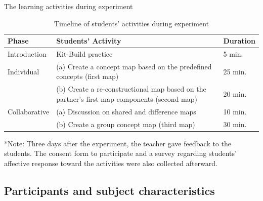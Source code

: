\begin{frame}{The learning activities during experiment}
\begin{table}[tb]
\begin{center}
\begin{tabular}{p{2.5cm}|p{5.5cm}|p{2cm}}%
\hline
Phase & Students' Activity & Duration\\
\hline
Introduction & Kit-Build practice & 5 min.\\
Individual & (a) Create a concept map based on the predefined concepts (first map) & 25 min.\\
& (b) Create a re-constructional map based on the partner's first map components (second map) & 20 min.\\
Collaborative & (a) Discussion on shared and difference maps & 10 min.\\
& (b) Create a group concept map  (third map) & 30 min.\\
\hline
\end{tabular}
\end{center}
\caption{\label{tab:exp_setting} Timeline of students' activities during experiment}
\end{table}
 
{\tiny **Note: Three days after the experiment, the teacher gave feedback to the students.
The consent form to participate and a survey regarding students' affective response
toward the activities were also collected afterward. }

\end{frame}

\subsection{Participants and subject characteristics}




